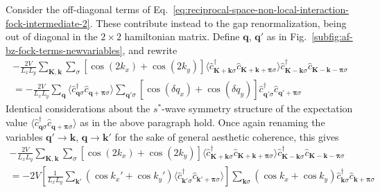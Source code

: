 Consider the off-diagonal terms of Eq.~\eqref{eq:reciprocal-space-non-local-interaction-fock-intermediate-2}. These contribute instead to the gap renormalization, being out of diagonal in the $2\times2$ hamiltonian matrix. Define $\mathbf{q}$, $\mathbf{q}'$ as in Fig.~\ref{subfig:af-bz-fock-terms-newvariables}, and rewrite
\begin{multline*}
	-\frac{2V}{L_x L_y} \sum_{\mathbf{K}, \mathbf{k}} \sum_\sigma \left[
		\cos \left(
			2k_x
		\right)	+ \cos \left(
			2k_y
		\right)	
	\right]
	\langle
		\hat c_{\mathbf{K}+\mathbf{k} \sigma}^\dagger 
		\hat 	c_{\mathbf{K}+\mathbf{k}+\bm{\pi} \sigma}
	\rangle
	\hat c_{\mathbf{K}-\mathbf{k} \sigma}^\dagger  \hat c_{\mathbf{K}-\mathbf{k}-\bm{\pi}\sigma} \\
	= -\frac{2V}{L_xL_y} \sum_{\mathbf{q}} \langle
		\hat c_{\mathbf{q}\sigma}^\dagger 
		\hat c_{\mathbf{q}+\bm{\pi}\sigma}
	\rangle \sum_{\mathbf{q}'\sigma} \left[
		\cos \left(
			\delta q_x
		\right)	+ \cos \left(
			\delta q_y
		\right)	
	\right] \hat c_{\mathbf{q}'\sigma}^\dagger  \hat c_{\mathbf{q}'+\bm{\pi}\sigma}
\end{multline*}
Identical considerations about the $s^*$-wave symmetry structure of the expectation value $\langle \hat c_{\mathbf{q}\sigma}^\dagger \hat c_{\mathbf{q}+\bm{\pi}\sigma} \rangle$ as in the above paragraph hold. Once again renaming the variables $\mathbf{q}'\to\mathbf{k}$, $\mathbf{q}\to\mathbf{k}'$ for the sake of general aesthetic coherence, this gives
\begin{multline}
	-\frac{2V}{L_x L_y} \sum_{\mathbf{K}, \mathbf{k}} \sum_\sigma \left[
		\cos \left(
			2k_x
		\right)	+ \cos \left(
			2k_y
		\right)	
	\right]
	\langle
		\hat c_{\mathbf{K}+\mathbf{k} \sigma}^\dagger 
		\hat 	c_{\mathbf{K}+\mathbf{k}+\bm{\pi} \sigma}
	\rangle
	\hat c_{\mathbf{K}-\mathbf{k} \sigma}^\dagger  \hat c_{\mathbf{K}-\mathbf{k}-\bm{\pi}\sigma} \\
	= -2V \left[
		\frac{1}{L_xL_y} \sum_{\mathbf{k}'}
		\left(
			\cos k_x' + \cos k_y'
		\right) \langle
			\hat c_{\mathbf{k}'\sigma}^\dagger  \hat c_{\mathbf{k}'+\bm{\pi}\sigma}
		\rangle
	\right]
	\sum_{\mathbf{k}\sigma} \left(
		\cos k_x + \cos	k_y	
	\right)
	\hat c_{\mathbf{k}\sigma}^\dagger  \hat c_{\mathbf{k}+\bm{\pi}\sigma}
\end{multline}

